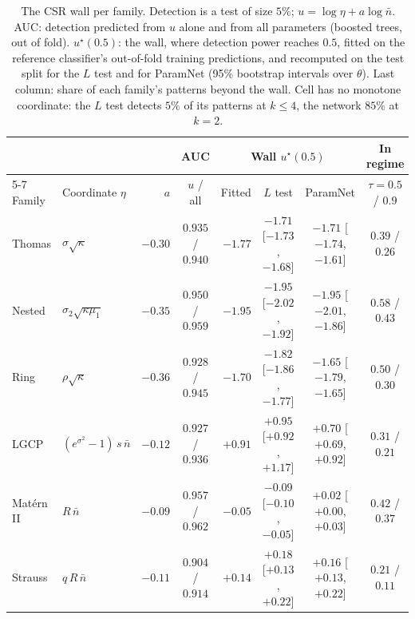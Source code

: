 \documentclass[twoside]{article}
\newcommand{\nb}{\bar n}
\begin{document}
\begin{table}[t]
\caption{The CSR wall per family. Detection is a test of size $5\%$; $u=\log\eta+a\log\nb$. AUC: detection predicted
from $u$ alone and from all parameters (boosted trees, out of fold). $u^\star(0.5)$: the wall, where detection power
reaches $0.5$, fitted on the reference classifier's out-of-fold training predictions, and recomputed on the test split
for the $L$ test and for ParamNet (95\% bootstrap intervals over $\theta$). Last column: share of each family's
patterns beyond the wall. Cell has no monotone coordinate: the $L$ test detects $5\%$ of its patterns at $k\le4$, the
network $85\%$ at $k=2$.}
\label{tab:wall}
\begin{center}
\footnotesize
\begin{tabular}{@{}llrcrccc@{}}
\toprule
& & & AUC & \multicolumn{3}{c}{Wall $u^\star(0.5)$} & In regime \\
\cmidrule(lr){5-7}
Family & Coordinate $\eta$ & $a$ & $u$ / all & Fitted & $L$ test & ParamNet & $\tau=0.5$ / $0.9$ \\
\midrule
Thomas      & $\sigma\sqrt\kappa$               & $-0.30$ & $0.935$ / $0.940$ & $-1.77$ & $-1.71$ {\scriptsize[$-1.73$, $-1.68$]} & $-1.71$ {\scriptsize[$-1.74$, $-1.61$]} & $0.39$ / $0.26$ \\
Nested      & $\sigma_2\sqrt{\kappa\mu_1}$      & $-0.35$ & $0.950$ / $0.959$ & $-1.95$ & $-1.95$ {\scriptsize[$-2.02$, $-1.92$]} & $-1.95$ {\scriptsize[$-2.01$, $-1.86$]} & $0.58$ / $0.43$ \\
Ring        & $\rho\sqrt\kappa$                 & $-0.36$ & $0.928$ / $0.945$ & $-1.70$ & $-1.82$ {\scriptsize[$-1.86$, $-1.77$]} & $-1.65$ {\scriptsize[$-1.79$, $-1.65$]} & $0.50$ / $0.30$ \\
LGCP        & $(e^{\sigma^2}-1)\,s\,\nb$        & $-0.12$ & $0.927$ / $0.936$ & $+0.91$ & $+0.95$ {\scriptsize[$+0.92$, $+1.17$]} & $+0.70$ {\scriptsize[$+0.69$, $+0.92$]} & $0.31$ / $0.21$ \\
Mat\'ern II & $R\,\nb$                          & $-0.09$ & $0.957$ / $0.962$ & $-0.05$ & $-0.09$ {\scriptsize[$-0.10$, $-0.05$]} & $+0.02$ {\scriptsize[$+0.00$, $+0.03$]} & $0.42$ / $0.37$ \\
Strauss     & $q\,R\,\nb$                       & $-0.11$ & $0.904$ / $0.914$ & $+0.14$ & $+0.18$ {\scriptsize[$+0.13$, $+0.22$]} & $+0.16$ {\scriptsize[$+0.13$, $+0.22$]} & $0.21$ / $0.11$ \\
\bottomrule
\end{tabular}
\end{center}
\end{table}
\end{document}
